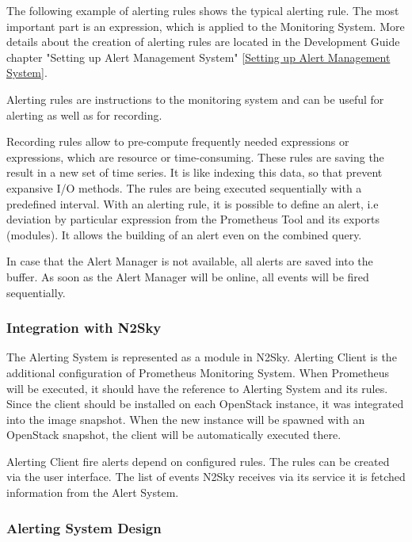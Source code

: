 The following example of alerting rules shows the typical alerting rule. The most important part is an expression, which is applied to the Monitoring System. More details about the creation of alerting rules are located in the Development Guide chapter "Setting up Alert Management System" \autoref{Setting up Alert Management System}.

Alerting rules are instructions to the monitoring system and can be useful for alerting as well as for recording. 

Recording rules allow to pre-compute frequently needed expressions or expressions, which are resource or time-consuming.  These rules are saving the result in a new set of time series. It is like indexing this data, so that prevent expansive I/O methods. 
The rules are being executed sequentially with a predefined interval. 
With an alerting rule, it is possible to define an alert, i.e deviation by particular expression from the Prometheus Tool and its exports (modules). It allows the building of an alert even on the combined query. 

In case that the Alert Manager is not available, all alerts are saved into the buffer. As soon as the Alert Manager will be online, all events will be fired sequentially. 



\subsubsection{Integration with N2Sky}\label{Integration with N2Sky Alerting}

The Alerting System is represented as a module in N2Sky. 
Alerting Client is the additional configuration of Prometheus Monitoring System. When Prometheus will be executed, it should have the reference to Alerting System and its rules. 
Since the client should be installed on each OpenStack instance, it was integrated into the image snapshot. When the new instance will be spawned with an OpenStack snapshot, the client will be automatically executed there.  

Alerting Client fire alerts depend on configured rules. The rules can be created via the user interface. The list of events N2Sky receives via its service it is fetched information from the Alert System. 
 
\subsubsection{Alerting System Design}\label{Alerting System Design}

